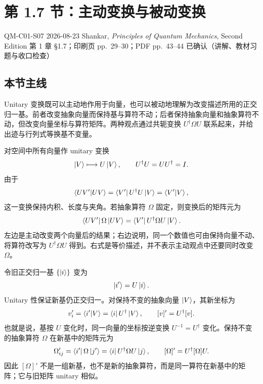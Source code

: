 \section{第 1.7 节：主动变换与被动变换}
\label{section:QM-C01-S07}

\studymeta
  {QM-C01-S07}
  {2026-08-23}
  {Shankar, \textit{Principles of Quantum Mechanics}, Second Edition}
  {第 1 章 \S 1.7；印刷页 pp.~29--30；PDF pp.~43--44}
  {已确认（讲解、教材习题与收口检查）}

\subsection{本节主线}

Unitary 变换既可以主动地作用于向量，也可以被动地理解为改变描述所用的正交归一基。前者改变抽象向量而保持基与算符不动；后者保持抽象向量和抽象算符不动，但改变向量坐标与算符矩阵。两种观点通过共轭变换 $U^\dagger\Omega U$ 联系起来，并给出迹与行列式等换基不变量。


对空间中所有向量作 unitary 变换
\begin{equation}
  \left|V\right\rangle\longmapsto U\left|V\right\rangle,
  \qquad U^\dagger U=UU^\dagger=I.
  \label{eq:QM-C01-S07-active}
\end{equation}
由于
\[
  \left\langle UV' \middle| UV \right\rangle=\left\langle V'\right|U^\dagger U\left|V\right\rangle=\left\langle V' \middle| V \right\rangle,
\]
这一变换保持内积、长度与夹角。若抽象算符 $\Omega$ 固定，则变换后的矩阵元为
\begin{equation}
  \left\langle UV'\right|\Omega\left|UV\right\rangle
  =\left\langle V'\right|U^\dagger\Omega U\left|V\right\rangle.
  \label{eq:QM-C01-S07-active-matrix-element}
\end{equation}
左边是主动改变两个向量后的结果；右边说明，同一个数值也可由保持向量不动、将算符改写为 $U^\dagger\Omega U$ 得到。右式是等价描述，并不表示主动观点中还要同时改变 $\Omega$。


令旧正交归一基 $\{\left|i\right\rangle\}$ 变为
\begin{equation}
  \left|i'\right\rangle=U\left|i\right\rangle.
  \label{eq:QM-C01-S07-basis-change}
\end{equation}
Unitary 性保证新基仍正交归一。对保持不变的抽象向量 $\left|V\right\rangle$，其新坐标为
\begin{equation}
  v_i'=\left\langle i' \middle| V \right\rangle=\left\langle i\right|U^\dagger\left|V\right\rangle,
  \qquad
  [v]'=U^\dagger[v].
  \label{eq:QM-C01-S07-coordinate-change}
\end{equation}
也就是说，基按 $U$ 变化时，同一向量的坐标按逆变换 $U^{-1}=U^\dagger$ 变化。保持不变的抽象算符 $\Omega$ 在新基中的矩阵元为
\begin{equation}
  \Omega_{ij}'
  =\left\langle i'\right|\Omega\left|j'\right\rangle
  =\left\langle i\right|U^\dagger\Omega U\left|j\right\rangle,
  \qquad
  [\Omega]'=U^\dagger[\Omega]U.
  \label{eq:QM-C01-S07-operator-basis-change}
\end{equation}
因此 $[\Omega]'$ 不是一组新基，也不是新的抽象算符，而是同一算符在新基中的矩阵；它与旧矩阵 unitary 相似。

